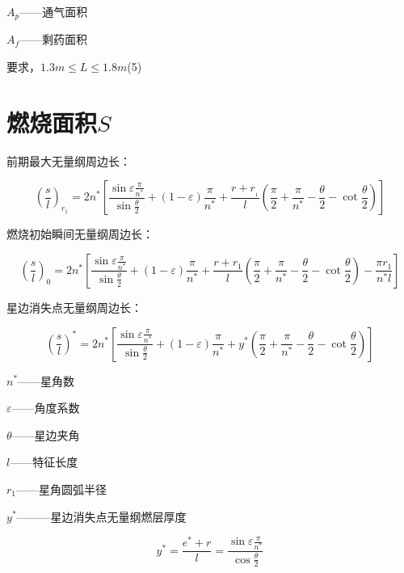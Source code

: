 $A_{p}$——通气面积

$A_{f}$——剩药面积

要求，$1.3m\leqslant L\leqslant 1.8m$\hspace{1em}(5)

\section{燃烧面积$S$}
前期最大无量纲周边长：

\begingroup
\fontsize{16}{14}\selectfont 
\[\left( \frac{s}{l} \right) _{r_1}=2n^*\left[ \frac{\sin \varepsilon \frac{\pi}{n^*}}{\sin \frac{\theta}{2}}+(1-\varepsilon )\frac{\pi}{n^*}+\frac{r+r_{_1}}{l}\left( \frac{\pi}{2}+\frac{\pi}{n^*}-\frac{\theta}{2}-\cot \frac{\theta}{2} \right) \right] 
\]
\endgroup

\vspace{1em}
燃烧初始瞬间无量纲周边长：

\begingroup
\fontsize{16}{14}\selectfont 
\[\left( \frac{s}{l} \right) _0=2n^*\left[ \frac{\sin \varepsilon \frac{\pi}{n^*}}{\sin \frac{\theta}{2}}+(1-\varepsilon )\frac{\pi}{n^*}+\frac{r+r_1}{l}\left( \frac{\pi}{2}+\frac{\pi}{n^*}-\frac{\theta}{2}-\cot \frac{\theta}{2} \right) -\frac{\pi r_1}{n^*l} \right] 
\]
\endgroup
\vspace{1em}

星边消失点无量纲周边长：

\begingroup
\fontsize{16}{14}\selectfont 
\[
\left( \frac{s}{l} \right) ^*=2n^*\left[ \frac{\sin \varepsilon \frac{\pi}{n^*}}{\sin \frac{\theta}{2}}+(1-\varepsilon )\frac{\pi}{n^*}+y^*\left( \frac{\pi}{2}+\frac{\pi}{n^*}-\frac{\theta}{2}-\cot \frac{\theta}{2} \right) \right] 
\]
\endgroup
\vspace{1em}

$n^*$——星角数

$\varepsilon$——角度系数

$\theta$——星边夹角

$l$——特征长度

$r_{1}$——星角圆弧半径

$y^*$———星边消失点无量纲燃层厚度

\begingroup
\fontsize{16}{14}\selectfont 
\[
y^*=\frac{e^*+r}{l}=\frac{\sin \varepsilon \frac{\pi}{n^*}}{\cos \frac{\theta}{2}}
\]
\endgroup